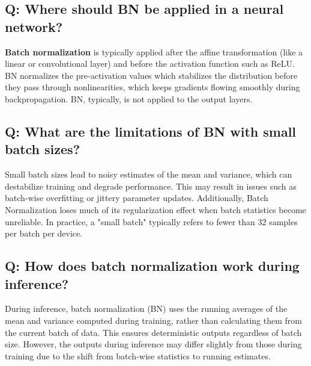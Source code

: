 \documentclass[11pt]{article}
\begin{document}
\subsection*{Q: Where should BN be applied in a neural network?}
\textbf{Batch normalization} is typically applied after the affine transformation (like a linear or convolutional layer) and before the activation function such as ReLU. BN normalizes the pre-activation values which stabilizes the distribution before they pass through nonlinearities, which keeps gradients flowing smoothly during backpropagation. BN, typically, is not applied to the output layers.

\subsection*{Q: What are the limitations of BN with small batch sizes?}
Small batch sizes lead to noisy estimates of the mean and variance, which can destabilize training and degrade performance. This may result in issues such as batch-wise overfitting or jittery parameter updates. Additionally, Batch Normalization loses much of its regularization effect when batch statistics become unreliable. In practice, a "small batch" typically refers to fewer than 32 samples per batch per device.

\subsection*{Q: How does batch normalization work during inference?}
During inference, batch normalization (BN) uses the running averages of the mean and variance computed during training, rather than calculating them from the current batch of data. This ensures deterministic outputs regardless of batch size. However, the outputs during inference may differ slightly from those during training due to the shift from batch-wise statistics to running estimates.
\end{document}
